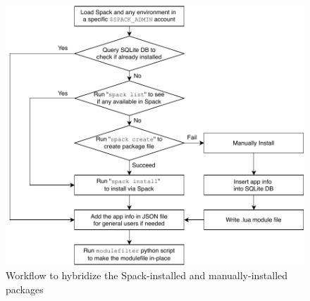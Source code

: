 \documentclass[conference]{IEEEtran}
\begin{document}
\begin{figure}[htbp]
  \centerline{\includegraphics[width=\linewidth]{figures/spack_h2_hybrid_flow}}
  \caption{Workflow to hybridize the Spack-installed and manually-installed packages}
  \label{fig:spack_h2_hybrid_flow}
\end{figure}
\end{document}
